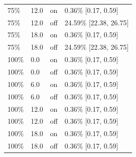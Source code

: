 \begin{table}[t]
\begin{tabular}{llll}
75\% & 12.0 & on & 0.36\% [0.17, 0.59] \\
75\% & 12.0 & off & 24.59\% [22.38, 26.75] \\
75\% & 18.0 & on & 0.36\% [0.17, 0.59] \\
75\% & 18.0 & off & 24.59\% [22.38, 26.75] \\
100\% & 0.0 & on & 0.36\% [0.17, 0.59] \\
100\% & 0.0 & off & 0.36\% [0.17, 0.59] \\
100\% & 6.0 & on & 0.36\% [0.17, 0.59] \\
100\% & 6.0 & off & 0.36\% [0.17, 0.59] \\
100\% & 12.0 & on & 0.36\% [0.17, 0.59] \\
100\% & 12.0 & off & 0.36\% [0.17, 0.59] \\
100\% & 18.0 & on & 0.36\% [0.17, 0.59] \\
100\% & 18.0 & off & 0.36\% [0.17, 0.59] \\
\bottomrule
\end{tabular}
\end{table}

